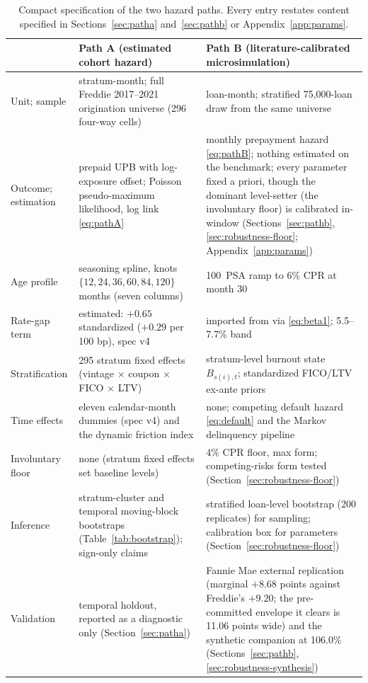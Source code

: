 \documentclass[12pt]{article}
\begin{document}
\begin{table}[H]
\centering
\caption{Compact specification of the two hazard paths. Every entry restates
content specified in Sections~\ref{sec:patha} and~\ref{sec:pathb} or
Appendix~\ref{app:params}.}
\label{tab:specbox}
\footnotesize
\begin{threeparttable}
\begin{tabular}{@{}p{2.2cm}p{5.9cm}p{5.9cm}@{}}
\toprule
 & Path A (estimated cohort hazard) & Path B (literature-calibrated microsimulation) \\
\midrule
Unit; sample & stratum-month; full Freddie 2017--2021 origination universe (296 four-way cells) & loan-month; stratified 75{,}000-loan draw from the same universe \\
Outcome; estimation & prepaid UPB with log-exposure offset; Poisson pseudo-maximum likelihood, log link \eqref{eq:pathA} & monthly prepayment hazard \eqref{eq:pathB}; nothing estimated on the benchmark; every parameter fixed a priori, though the dominant level-setter (the involuntary floor) is calibrated in-window (Sections~\ref{sec:pathb}, \ref{sec:robustness-floor}; Appendix~\ref{app:params}) \\
Age profile & seasoning spline, knots $\{12,24,36,60,84,120\}$ months (seven columns) & 100~PSA ramp to 6\% CPR at month 30 \\
Rate-gap term & estimated: $+0.65$ standardized ($+0.29$ per 100 bp), spec v4 & imported from \citet{liebersohn2024} via \eqref{eq:beta1}; 5.5--7.7\% band \\
Stratification & 295 stratum fixed effects (vintage $\times$ coupon $\times$ FICO $\times$ LTV) & stratum-level burnout state $B_{s(i),t}$; standardized FICO/LTV ex-ante priors \\
Time effects & eleven calendar-month dummies (spec v4) and the dynamic friction index & none; competing default hazard \eqref{eq:default} and the Markov delinquency pipeline \\
Involuntary floor & none (stratum fixed effects set baseline levels) & 4\% CPR floor, max form; competing-risks form tested (Section~\ref{sec:robustness-floor}) \\
Inference & stratum-cluster and temporal moving-block bootstraps (Table~\ref{tab:bootstrap}); sign-only claims & stratified loan-level bootstrap (200 replicates) for sampling; calibration box for parameters (Section~\ref{sec:robustness-floor}) \\
Validation & temporal holdout, reported as a diagnostic only (Section~\ref{sec:patha}) & Fannie Mae external replication (marginal $+8.68$ points against Freddie's $+9.20$; the pre-committed envelope it clears is 11.06 points wide) and the synthetic companion at 106.0\% (Sections~\ref{sec:pathb}, \ref{sec:robustness-synthesis}) \\

\end{tabular}
\end{threeparttable}
\end{table}
\end{document}
